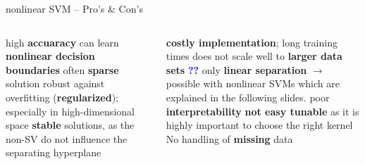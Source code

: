 
\setdraft

\begin{frame}{nonlinear SVM -- Pro's \& Con's}

\footnotesize

\begin{columns}[onlytextwidth]
  \begin{column}{0.5\textwidth}
    \footnotesize
    \begin{itemize}
      \positem high \textbf{accuaracy}
      \positem can learn \textbf{nonlinear decision boundaries}
      \positem often \textbf{sparse} solution
      \positem robust against overfitting (\textbf{regularized}); especially in 
      high-dimensional space 
      \positem \textbf{stable} solutions, as the non-SV do not influence the 
      separating hyperplane
    \end{itemize}
  \end{column}

  \begin{column}{0.5\textwidth}
    \footnotesize
    \begin{itemize}
      \negitem \textbf{costly implementation}; long training times
      \negitem does not scale well to \textbf{larger data sets} 
      \textcolor{blue}{\textbf{??}}
      \negitem only \textbf{linear separation} $\rightarrow$ possible 
      with nonlinear SVMs which are explained in the following slides.
      \negitem poor \textbf{interpretability}
      \negitem \textbf{not easy tunable} as it is highly important to choose the 
      right kernel
      \negitem No handling of \textbf{missing} data
      
    \end{itemize}
  \end{column}
\end{columns}

\vfill

\small


\end{frame}

\undraft


